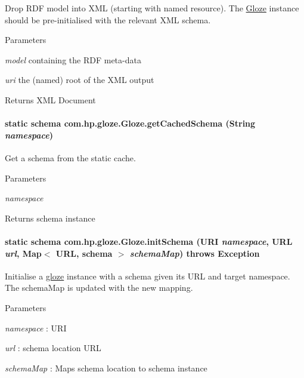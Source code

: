 Drop RDF model into XML (starting with named resource). The \hyperlink{classcom_1_1hp_1_1gloze_1_1_gloze}{Gloze} instance should be pre-\/initialised with the relevant XML schema. 
\begin{DoxyParams}{Parameters}
\item[{\em model}]containing the RDF meta-\/data \item[{\em uri}]the (named) root of the XML output \end{DoxyParams}
\begin{DoxyReturn}{Returns}
XML Document 
\end{DoxyReturn}
\hypertarget{classcom_1_1hp_1_1gloze_1_1_gloze_a215a61b8702140cb4f342140f87bf963}{
\paragraph[{getCachedSchema}]{\setlength{\rightskip}{0pt plus 5cm}static schema com.hp.gloze.Gloze.getCachedSchema (String {\em namespace})}\hfill}
\label{classcom_1_1hp_1_1gloze_1_1_gloze_a215a61b8702140cb4f342140f87bf963}
Get a schema from the static cache. 
\begin{DoxyParams}{Parameters}
\item[{\em namespace}]\end{DoxyParams}
\begin{DoxyReturn}{Returns}
schema instance 
\end{DoxyReturn}
\hypertarget{classcom_1_1hp_1_1gloze_1_1_gloze_a02aace1b3f879b77a6ebf2b14c72dac9}{
\paragraph[{initSchema}]{\setlength{\rightskip}{0pt plus 5cm}static schema com.hp.gloze.Gloze.initSchema (URI {\em namespace}, \/  URL {\em url}, \/  Map$<$ URL, schema $>$ {\em schemaMap})  throws Exception }\hfill}
\label{classcom_1_1hp_1_1gloze_1_1_gloze_a02aace1b3f879b77a6ebf2b14c72dac9}
Initialise a \hyperlink{namespacecom_1_1hp_1_1gloze}{gloze} instance with a schema given its URL and target namespace. The schemaMap is updated with the new mapping. 
\begin{DoxyParams}{Parameters}
\item[{\em namespace}]: URI \item[{\em url}]: schema location URL \item[{\em schemaMap}]: Maps schema location to schema instance \end{DoxyParams}

